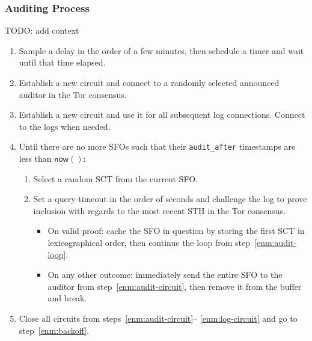 \subsubsection{Auditing Process}
TODO: add context
\begin{enumerate}
	\item\label{enm:backoff} Sample a delay in the order of a few minutes, then
		schedule a timer and wait until that time elapsed.
	\item\label{enm:audit-circuit} Establish a new circuit and connect to a
		randomly selected announced auditor in the Tor consensus.
	\item\label{enm:log-circuit} Establish a new circuit and use it for all
		subsequent log connections.  Connect to the logs when needed.
	\item\label{enm:audit-loop} Until there are no more SFOs such that their
		\texttt{audit\_after} timestamps are less than $\mathsf{now}()$:
		\begin{enumerate}
			\item Select a random SCT from the current SFO.
			\item Set a query-timeout in the order of seconds and challenge the
				log to prove inclusion with regards to the most recent STH in
				the Tor consensus.
				\begin{itemize}
					\item On valid proof: cache the SFO in question by storing
						the first SCT in lexicographical order, then continue
						the loop from step~\ref{enm:audit-loop}.
					\item On any other outcome: immediately send the entire SFO
						to the auditor from step~\ref{enm:audit-circuit}, then
						remove it from the buffer and break.
				\end{itemize}
		\end{enumerate}
	\item Close all circuits from steps~\ref{enm:audit-circuit}--%
		\ref{enm:log-circuit} and go to step~\ref{enm:backoff}.
\end{enumerate}

